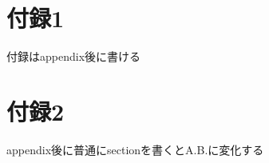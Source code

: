 \documentclass[titlepage]{jlreq}
\begin{document}
\cite{hon1-a}

\cite{hon1-b}

\cite{webpage1}

\cite{handbook}







\appendix

\section{付録1}

付録はappendix後に書ける

\section{付録2}

appendix後に普通にsectionを書くとA.B.に変化する
\end{document}
